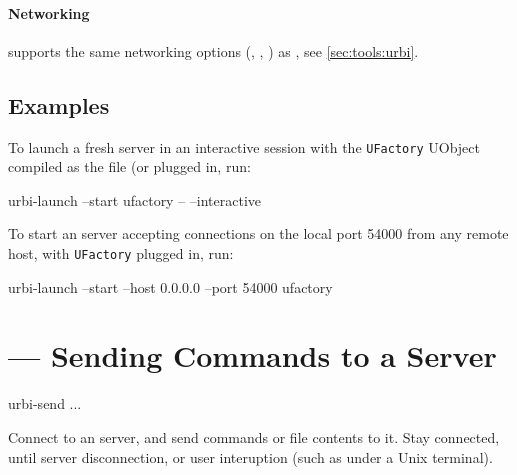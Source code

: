 \paragraph{Networking}
 supports the same networking options
(, , ) as
, see \autoref{sec:tools:urbi}.

\subsection{Examples}

To launch a fresh server in an interactive session with the
\lstinline|UFactory| UObject compiled as the file 
(or  plugged in, run:

\begin{shell}
urbi-launch --start ufactory -- --interactive
\end{shell}

To start an \urbi server accepting connections on the local port 54000
from any remote host, with \lstinline|UFactory| plugged in, run:

\begin{shell}
urbi-launch --start --host 0.0.0.0 --port 54000 ufactory
\end{shell}


\section{ --- Sending \us Commands to a Server}
\label{sec:tools:urbi-send}

\begin{shell}
urbi-send ...
\end{shell}

Connect to an \urbi server, and send commands or file contents to it.
Stay connected, until server disconnection, or user interuption (such
as  under a Unix terminal).

